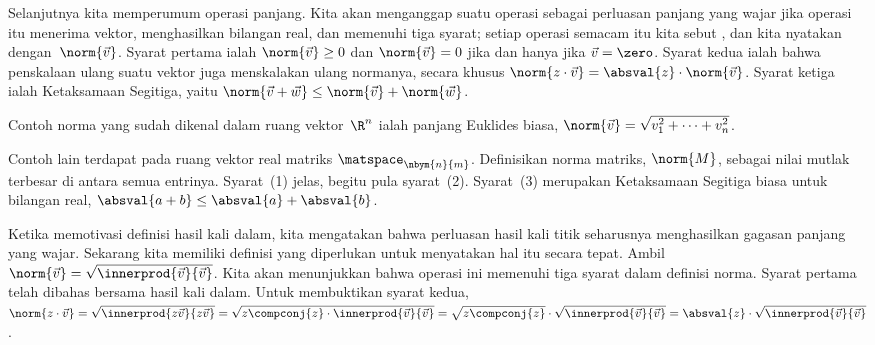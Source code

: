 Selanjutnya kita memperumum operasi panjang.
Kita akan menganggap suatu operasi sebagai perluasan panjang yang wajar
jika operasi itu menerima vektor, menghasilkan bilangan real, dan memenuhi
tiga syarat; setiap operasi semacam itu kita sebut
, dan kita nyatakan dengan~$\norm{\vec{v}}$.
Syarat pertama ialah $\norm{\vec{v}}\geq 0$ dan
$\norm{\vec{v}}= 0$ jika dan hanya jika $\vec{v}=\zero$.
Syarat kedua ialah bahwa penskalaan ulang suatu vektor juga menskalakan ulang
normanya, secara khusus
$\norm{z\cdot \vec{v}}=\absval{z}\cdot\norm{\vec{v}}$.
Syarat ketiga ialah
Ketaksamaan Segitiga,
yaitu $\norm{\vec{v}+\vec{w}}\leq\norm{\vec{v}}+\norm{\vec{w}}$.

Contoh norma yang sudah dikenal dalam ruang vektor~$\R^n$ ialah panjang
Euklides biasa, $\norm{\vec{v}}=\sqrt{\smashdp{v_1^2+\cdots+v_n^2}}$.

Contoh lain terdapat pada ruang vektor real matriks
$\matspace_{\nbym{n}{m}}$.
Definisikan norma matriks, $\norm{M}$, sebagai nilai mutlak terbesar di antara
semua entrinya.
Syarat~(1) jelas, begitu pula syarat~(2).
Syarat~(3) merupakan Ketaksamaan Segitiga biasa untuk bilangan real,
$\absval{a+b}\leq\absval{a}+\absval{b}$.


Ketika memotivasi definisi hasil kali dalam, kita mengatakan bahwa
perluasan hasil kali titik seharusnya menghasilkan gagasan panjang yang wajar.
Sekarang kita memiliki definisi yang diperlukan untuk menyatakan hal itu secara
tepat.
Ambil
$\norm{\vec{v}}=\sqrt{\smashdp{\innerprod{\vec{v}}{\vec{v}}}}$.
Kita akan menunjukkan bahwa operasi ini memenuhi tiga syarat dalam definisi
norma.
Syarat pertama telah dibahas bersama hasil kali dalam.
Untuk membuktikan syarat kedua,
$\norm{z\cdot\vec{v}}
=\sqrt{\smashdp{\innerprod{z\vec{v}}{z\vec{v}}}}
=\sqrt{\smashdp{z\compconj{z}\cdot\innerprod{\vec{v}}{\vec{v}}}}
=\sqrt{z\compconj{z}}\cdot\sqrt{\smashdp{\innerprod{\vec{v}}{\vec{v}}}}
=\absval{z}\cdot\sqrt{\smashdp{\innerprod{\vec{v}}{\vec{v}}}}$.

